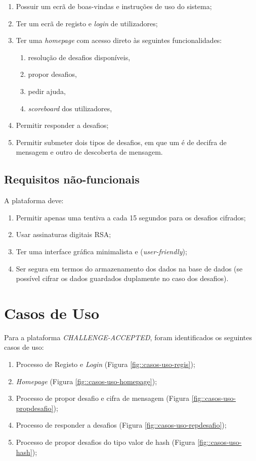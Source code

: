 \begin{enumerate}
	\item Possuir um ecrã de boas-vindas e instruções de uso do sistema;
	\item Ter um ecrã de registo e \emph{login} de utilizadores;
	\item Ter uma \textit{homepage} com acesso direto às seguintes funcionalidades:
	\begin{enumerate}
		\item resolução de desafios disponíveis,
		\item propor desafios,
		\item pedir ajuda,
		\item \textit{scoreboard} dos utilizadores,
	\end{enumerate}
	\item Permitir responder a desafios;
	\item Permitir submeter dois tipos de desafios, em que um é de decifra de mensagem e outro de descoberta de mensagem.
\end{enumerate}


\subsection{Requisitos não-funcionais}
\label{ssec::engsoft:requisitos:nao-funcionais}

A plataforma deve:

\begin{enumerate}
	\item Permitir apenas uma tentiva a cada 15 segundos para os desafios cifrados;
	\item Usar assinaturas digitais \ac{RSA};
	\item Ter uma interface gráfica minimalista e (\textit{user-friendly});
	\item Ser segura em termos do armazenamento dos dados na base de dados (se possível cifrar os dados guardados duplamente no caso dos desafios).
\end{enumerate}


\section{Casos de Uso}
\label{sec::engsoft:casos-uso}

Para a plataforma \emph{CHALLENGE-ACCEPTED}, foram identificados os seguintes casos de uso:
\begin{enumerate}
	\item Processo de Registo e \emph{Login} (Figura \ref{fig::casos-uso-regis});
	\item \textit{Homepage} (Figura \ref{fig::casos-uso-homepage});
	\item Processo de propor desafio e cifra de mensagem (Figura \ref{fig::casos-uso-propdesafio});
	\item Processo de responder a desafios (Figura \ref{fig::casos-uso-repdesafio});
	\item Processo de propor desafios do tipo valor de hash (Figura \ref{fig::casos-uso-hash});
\end{enumerate}

